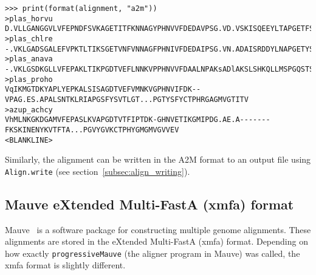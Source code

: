 \begin{verbatim}
>>> print(format(alignment, "a2m"))
>plas_horvu
D.VLLGANGGVLVFEPNDFSVKAGETITFKNNAGYPHNVVFDEDAVPSG.VD.VSKISQEEYLTAPGETFSVTLTV...PGTYGFYCEPHAGAGMVGKVTV
>plas_chlre
-.VKLGADSGALEFVPKTLTIKSGETVNFVNNAGFPHNIVFDEDAIPSG.VN.ADAISRDDYLNAPGETYSVKLTA...AGEYGYYCEPHQGAGMVGKIIV
>plas_anava
-.VKLGSDKGLLVFEPAKLTIKPGDTVEFLNNKVPPHNVVFDAALNPAKsADlAKSLSHKQLLMSPGQSTSTTFPAdapAGEYTFYCEPHRGAGMVGKITV
>plas_proho
VqIKMGTDKYAPLYEPKALSISAGDTVEFVMNKVGPHNVIFDK--VPAG.ES.APALSNTKLRIAPGSFYSVTLGT...PGTYSFYCTPHRGAGMVGTITV
>azup_achcy
VhMLNKGKDGAMVFEPASLKVAPGDTVTFIPTDK-GHNVETIKGMIPDG.AE.A-------FKSKINENYKVTFTA...PGVYGVKCTPHYGMGMVGVVEV
<BLANKLINE>
\end{verbatim}
Similarly, the alignment can be written in the A2M format to an output file using \verb|Align.write| (see section~\ref{subsec:align_writing}).

\subsection{Mauve eXtended Multi-FastA (xmfa) format}
\label{subsec:align_mauve}

Mauve~\cite{darling2004} is a software package for constructing multiple genome alignments. These alignments are stored in the eXtended Multi-FastA (xmfa) format.
Depending on how exactly \verb|progressiveMauve| (the aligner program in Mauve) was called, the xmfa format is slightly different.


